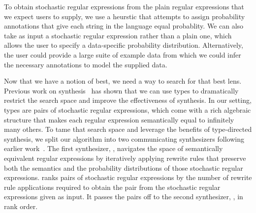 \documentclass[acmsmall,screen,anonymous]{acmart}
\begin{document}
To obtain stochastic regular expressions from the plain regular
expressions that we expect users to supply, we use a heurstic 
that attempts to assign
probability annotations that give each string in the language equal
probablity.  We can also take as input a stochastic regular
expression rather than a plain one, which allows the user to
specify a data-specific probability distribution.  Alternatively,
the user could provide a large suite of example data from which we
could infer the necessary annotations to model the supplied data. 

Now that we have a notion of best, we need a way to search for that
best lens.  Previous work on synthesis~ has shown
that we can use types to dramatically restrict the search space and
improve the effectiveness of synthesis.  In our setting, types are
pairs of stochastic regular expressions, which come with a rich
algebraic structure that makes each regular expression semantically
equal to infinitely many others.  To tame that search space and
leverage the benefits of type-directed synthesis, we split our
algorithm into two communicating synthesizers following earlier
work~\cite{quotient-lens-synthesis}.  The first
synthesizer, \RXSearch, navigates the space of semantically equivalent
regular expressions by iteratively applying rewrite rules that
preserve both the semantics and the probability
distributions of those stochastic regular expressions. \RXSearch ranks
pairs of stochastic regular expressions 
by the number of rewrite rule applications required to obtain the pair
from the stochastic regular expressions given as input. It passes the
pairs off to the second synthesizer, \GreedySynth, in rank order.
\end{document}
